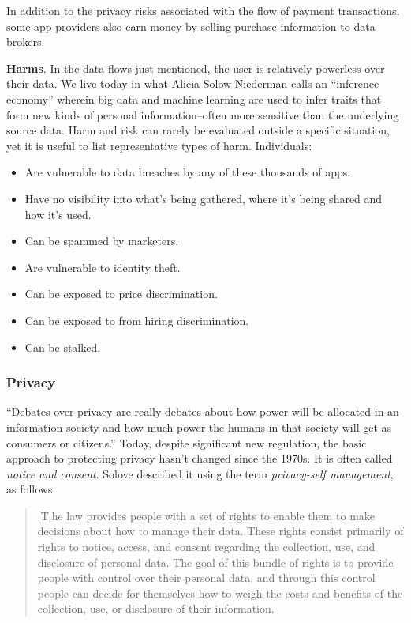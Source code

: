 \documentclass[11pt, oneside]{article}   	%
\begin{document}
In addition to the privacy risks associated with the flow of payment transactions, some app providers also earn money by selling purchase information to data brokers.

\textbf{Harms}. In the data flows just mentioned, the user is relatively powerless over their data. We live today in what Alicia Solow-Niederman calls an ``inference economy''\cite{Solow-Niederman2022} wherein big data and machine learning are used to infer traits that form new kinds of personal information--often more sensitive than the underlying source data. Harm and risk can rarely be evaluated outside a specific situation\cite{Solove2023}, yet it is useful to list representative types of harm. Individuals:

\begin{itemize}
	\item Are vulnerable to data breaches by any of these thousands of apps.
	\item Have no visibility into what's being gathered, where it's being shared and how it's used.
	\item Can be spammed by marketers.
	\item Are vulnerable to identity theft.
	\item Can be exposed to price discrimination.
	\item Can be exposed to from hiring discrimination.
	\item Can be stalked.
\end{itemize}

\subsubsection{Privacy}

``Debates over privacy are really debates about how power will be allocated in an information society and how much power the humans in that society will get as consumers or citizens.''\cite{Richards2021} Today, despite significant new regulation, the basic approach to protecting privacy hasn't changed since the 1970s. It is often called \emph{notice and consent}. Solove described it using the term \emph{privacy-self management}, as follows:

\begin{quote}
	[T]he law provides people with a set of rights to enable them to make decisions about how to manage their data. These rights consist primarily of rights to notice, access, and consent regarding the collection, use, and disclosure of personal data. The goal of this bundle of rights is to provide people with control over their  personal data, and through this  control people can decide for themselves how to weigh the costs and benefits of the collection, use, or disclosure of their information.\cite{Solove2012}
\end{quote} 
\end{document}

